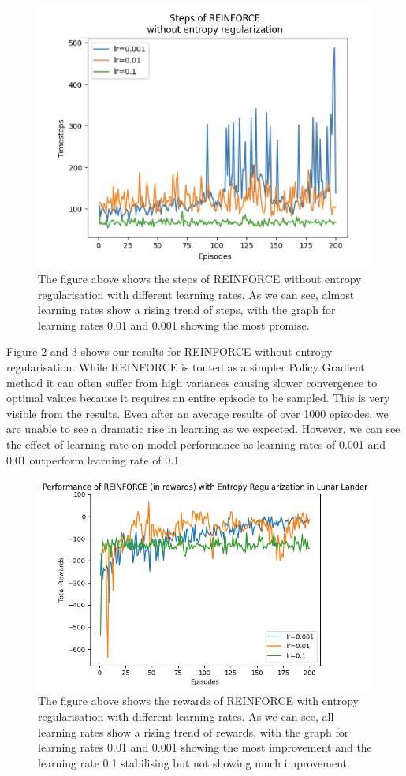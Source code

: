 \documentclass{article}
\begin{document}
\begin{figure}[h!]
\centering
\includegraphics[width=0.85\linewidth]{Report/images/03.Steps_of_REINFORCE_without_ER.png}
\caption{\label{fig:ReinforceEntropy_Rewards}The figure above shows the steps of REINFORCE without entropy regularisation with different learning rates. As we can see, almost learning rates show a rising trend of steps, with the graph for learning rates 0.01 and 0.001 showing the most promise. }
\end{figure}
\par Figure 2 and 3 shows our results for REINFORCE without entropy regularisation. While REINFORCE is touted as a simpler Policy Gradient method it can often suffer from high variances causing slower convergence to optimal values because it requires an entire episode to be sampled. This is very visible from the results. Even after an average results of over 1000 episodes, we are unable to see a dramatic rise in learning as we expected. However, we can see the effect of learning rate on model performance as learning rates of 0.001 and 0.01 outperform learning rate of 0.1. 

\begin{figure}[h!]
\centering
\includegraphics[width=0.85\linewidth]{Report/images/04.Performance_of_REINFORCE_with_ER_Rewards.png}
\caption{\label{fig:ReinforceEntropy_Rewards_LR}The figure above shows the rewards of REINFORCE with entropy regularisation with different learning rates. As we can see, all learning rates show a rising trend of rewards, with the graph for learning rates 0.01 and 0.001 showing the most improvement and the learning rate 0.1 stabilising but not showing much improvement. }
\end{figure}
\end{document}
